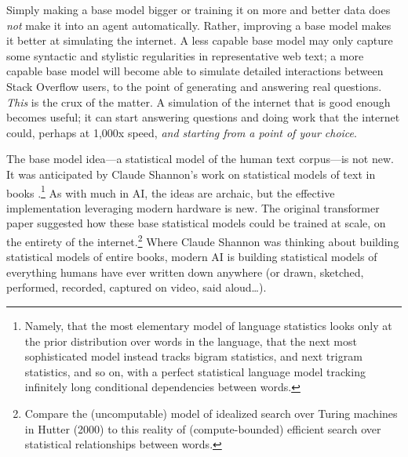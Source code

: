 Simply making a base model bigger or training it on more and better data does
\emph{not} make it into an agent automatically. Rather, improving a base model
makes it better at simulating the internet. A less capable base model may only
capture some syntactic and stylistic regularities in representative web text; a
more capable base model will become able to simulate detailed interactions
between Stack Overflow users, to the point of generating and answering real
questions. \emph{This} is the crux of the matter. A simulation of the internet
that is good enough becomes useful; it can start answering questions and doing
work that the internet could, perhaps at 1,000x speed, \emph{and starting from
a point of your choice}.

The base model idea---a statistical model of the human text corpus---is not
new. It was anticipated by Claude Shannon's work on statistical models of text
in books \cite{shannon1951english}.\footnote{Namely, that the most elementary
model of language statistics looks only at the prior distribution over words in
the language, that the next most sophisticated model instead tracks bigram
statistics, and next trigram statistics, and so on, with a perfect statistical
language model tracking infinitely long conditional dependencies between
words.} As with much in AI, the ideas are archaic, but the effective
implementation leveraging modern hardware is new. The original transformer
paper suggested how these base statistical models could be trained at scale, on
the entirety of the internet.\footnote{Compare the (uncomputable) model of
idealized search over Turing machines in Hutter (2000) \cite{hutter2000aixi} to
this reality of (compute-bounded) efficient search over statistical
relationships between words.} Where Claude Shannon was thinking about building
statistical models of entire books, modern AI is building statistical models of
everything humans have ever written down anywhere (or drawn, sketched,
performed, recorded, captured on video, said aloud\ldots).

